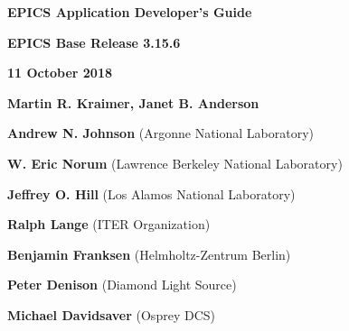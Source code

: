 \def\divider{\par
  \vskip 0.5in
  \hrulefill
  \vskip 0.5in
}

\divider

\Huge \textbf{EPICS Application Developer's Guide}

\vskip 0.5in

\Large \textbf{EPICS Base Release 3.15.6}

\textbf{11 October 2018}

\vskip 0.5in

\normalsize
\textbf{Martin R. Kraimer, Janet B. Anderson}

\textbf{Andrew N. Johnson} (Argonne National Laboratory)

\textbf{W. Eric Norum} (Lawrence Berkeley National Laboratory)

\textbf{Jeffrey O. Hill} (Los Alamos National Laboratory)

\textbf{Ralph Lange} (ITER Organization)

\textbf{Benjamin Franksen} (Helmholtz-Zentrum Berlin)

\textbf{Peter Denison} (Diamond Light Source)

\textbf{Michael Davidsaver} (Osprey DCS)

\divider
